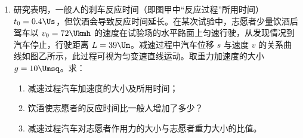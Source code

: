 \documentclass[\gkver]{gaokaozhenti}
\begin{document}
\begin{enumerate}
滑动变阻器 $R_{2}$：最大阻值 $20\UO$；

定值电阻：$R_{0}=3\UO$；

电源：电动势 $6\UV$，内阻可不计；

开关、导线若干。

回答下列问题：
\begin{enumerate}
	\item
	实验中滑动变阻器应选\_\_\_\_\_\_（填“$R_{1}$”或“$R_{2}$”），闭合开关 S 前应将滑片移至\_\_\_\_\_\_端（填“a”或“b”）。
	\item
	在实物图中，已正确连接了部分导线，请根据图甲电路完成剩余部分的连接。
	\item
	调节滑动变阻器，当电流表的读数为 $0.50\UA$ 时，电压表示数如图乙所示，读数为\_\_\_\_\_\_$\UV$。
	\item
	导线实际长度为\_\_\_\_\_\_$\Um$（保留 2 位有效数字）。
\end{enumerate}




\item
研究表明，一般人的刹车反应时间（即图甲中“反应过程”所用时间）$t_{0}=0.4\Us$，但饮酒会导致反应时间延长。在某次试验中，志愿者少量饮酒后驾车以 $v_{0}=72\Ukmh$ 的速度在试验场的水平路面上匀速行驶，从发现情况到汽车停止，行驶距离 $L=39\Um$。减速过程中汽车位移 $s$ 与速度 $v$ 的关系曲线如图乙所示，此过程可视为匀变速直线运动。取重力加速度的大小 $g=10\Umsq$。求：
\begin{enumerate}
	\item
	减速过程汽车加速度的大小及所用时间；
	\item
	饮酒使志愿者的反应时间比一般人增加了多少？
	\item
	减速过程汽车对志愿者作用力的大小与志愿者重力大小的比值。
\end{enumerate}


\end{enumerate}
\end{document}
